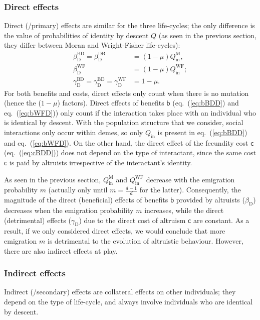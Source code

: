 \documentclass[11pt, letterpaper]{article}
\renewcommand{\eqref}[1]{\textup{{\normalfont eq.~(\ref{#1}}\normalfont)}}
\newcommand{\bb}{\mathsf{b}}
\newcommand{\cc}{\mathsf{c}}
\newcommand{\direct}{\mathrm{D}}
\newcommand{\Moran}{\textrm{M}}
\newcommand{\BD}{\textrm{BD}}
\newcommand{\DB}{\textrm{DB}}
\newcommand{\WF}{\textrm{WF}}
\newcommand{\inn}{\textrm{in}}
\newcommand{\Qin}{Q_{\inn}}
\begin{document}
\subsubsection{Direct effects}
Direct (/primary) effects are similar for the three life-cycles; the only difference is the value of probabilities of identity by descent $Q$ (as seen in the previous section, they differ between Moran and Wright-Fisher life-cycles):
%
\begin{subequations}\label{eq:directeffects}
\begin{align}
\beta_{\direct}^{\BD} = \beta_{\direct}^{\DB} &= \left( 1-\mu\right) \Qin^{\Moran}, \label{eq:bBDD}\\
\beta_{\direct}^{\WF} &= \left( 1-\mu\right) \Qin^{\WF}; \label{eq:bWFD}\\
%
%
\gamma_{\direct}^{\BD} = \gamma_{\direct}^{\BD} = \gamma_{\direct}^{\WF} &= 1-\mu.\label{eq:cBDD}
\end{align}
\end{subequations}
%
For both benefits and costs, direct effects only count when there is no mutation (hence the ($1-\mu$) factors). 
Direct effects of benefits $\bb$ (\eqref{eq:bBDD} and \eqref{eq:bWFD}) only count if the interaction takes place with an individual who is identical by descent. With the population structure that we consider, social interactions only occur within demes, so only $\Qin$ is present in \eqref{eq:bBDD} and \eqref{eq:bWFD}. On the other hand, the direct effect of the fecundity cost $\cc$ (\eqref{eq:cBDD}) does not depend on the type of interactant, since the same cost $\cc$ is paid by altruists irrespective of the interactant's identity. 

As seen in the previous section, $\Qin^{\Moran}$ and $\Qin^{\WF}$ decrease with the emigration probability $m$ (actually only until $m=\frac{d-1}{d}$ for the latter). Consequently, the magnitude of the direct (beneficial) effects of benefits $\bb$ provided by altruists ($\beta_{\direct}$) decreases when the emigration probability $m$ increases, while the direct (detrimental) effects ($\gamma_{\direct}$) due to the direct cost of altruism $\cc$ are constant. As a result, if we only considered direct effects, we would conclude that more emigration $m$ is detrimental to the evolution of altruistic behaviour. However, there are also indirect effects at play. 

\subsubsection{Indirect effects}
Indirect (/secondary) effects are collateral effects on other individuals; they depend on the type of life-cycle, and always involve individuals who are identical by descent. 
\end{document}
